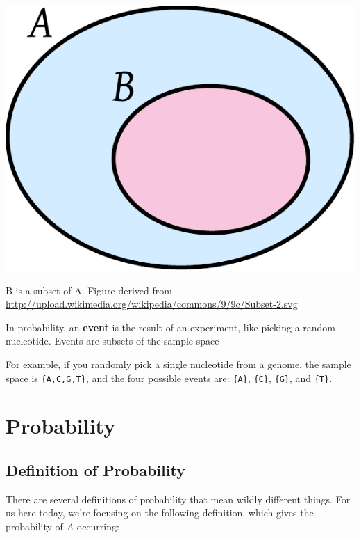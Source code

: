 \documentclass[12pt]{tufte-handout}
\newcommand{\set}[1]{\texttt{\{#1\}}}
\newcounter{QuestionCounter}
\newcommand{\Question}[1]{\bigskip
\refstepcounter{QuestionCounter}

    {                           %
      \addtolength{\leftskip}{1cm}
      \addtolength{\rightskip}{1mm}
      \setlength{\parindent}{0mm}
      \setlength{\parskip}{1em}
      \textbf{Group Question \theQuestionCounter:} 
      #1
      \par
    }

\bigskip
}
\begin{document}
\begin{marginfigure}
\centering 
\includegraphics[width=0.8\marginparwidth]{wikipedia_Subset-2.pdf}
\caption{B is a subset of A.  Figure derived from \url{http://upload.wikimedia.org/wikipedia/commons/9/9c/Subset-2.svg}}
\label{fig:subset}
\end{marginfigure}


\bigskip

In probability, an \textbf{event} is the result of an experiment, like picking a random nucleotide.  Events are subsets of the sample space

 For example, if you randomly pick a single nucleotide from a genome, the sample space is \set{A,C,G,T}, and the four possible events are: \set{A}, \set{C}, \set{G}, and \set{T}.

\section{Probability}
\label{sec:probability}

\subsection{Definition of Probability}
\label{sec:defin-prob}
There  are several definitions of probability that mean wildly different things.   For us here today, we're focusing on the following definition, which gives the probability of $A$ occurring:
\end{document}
